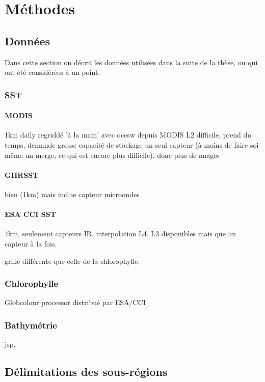 
\chapter{Méthodes}
\label{chp:méthodes}

\section{Données}

Dans cette section on décrit les données utilisées dans la suite de la thèse, ou qui ont été considérées à un point.

\subsection{SST}

\subsubsection{MODIS}
1km daily
regriddé 'à la main' avec occsw depuis MODIS L2
difficile, prend du temps, demande grosse capacité de stockage
un seul capteur (à moins de faire soi-même un merge, ce qui est encore plus difficile), donc plus de nuages

\subsubsection{GHRSST}
bien (1km) mais inclue capteur microondes

\subsubsection{ESA CCI SST}
4km, seulement capteurs IR.
interpolation L4.
L3 disponibles mais que un capteur à la fois.

grille différente que celle de la chlorophylle.

\subsection{Chlorophylle}

Globcolour processor
distribué par ESA/CCI

\subsection{Bathymétrie}

jsp.

\section{Délimitations des sous-régions}

